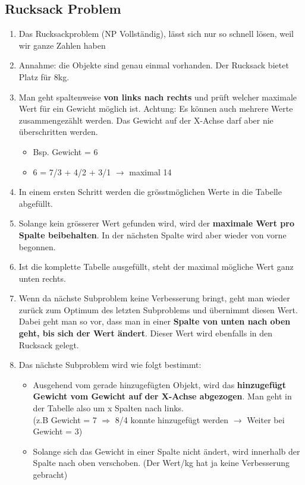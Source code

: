 \subsection{Rucksack Problem}
\begin{enumerate}
	\item Das Rucksackproblem (NP Vollständig), lässt sich nur so schnell lösen, weil wir ganze Zahlen haben
	\item Annahme: die Objekte sind genau einmal vorhanden. Der Rucksack bietet Platz für 8kg.
	\item Man geht spaltenweise \textbf{von links nach rechts} und prüft welcher maximale Wert für ein Gewicht möglich ist. Achtung: Es können auch mehrere Werte zusammengezählt werden. Das Gewicht auf der X-Achse darf aber nie überschritten werden.
	\begin{itemize}
		\item Bsp. Gewicht = 6
		\item 6 = 7/3 + 4/2 + 3/1 $\rightarrow$ maximal 14
	\end{itemize}
	\item In einem ersten Schritt werden die grösstmöglichen Werte in die Tabelle abgefüllt.
	\item Solange kein grösserer Wert gefunden wird, wird der \textbf{maximale Wert pro Spalte beibehalten}. In der nächsten Spalte wird aber wieder von vorne begonnen.
	\item Ist die komplette Tabelle ausgefüllt, steht der maximal mögliche Wert ganz unten rechts.
	\item Wenn da nächste Subproblem keine Verbesserung bringt, geht man wieder zurück zum Optimum des letzten Subproblems und übernimmt diesen Wert. Dabei geht man so vor, dass man in einer \textbf{Spalte von unten nach oben geht, bis sich der Wert ändert}. Dieser Wert wird ebenfalls in den Rucksack gelegt.
	\item Das nächste Subproblem wird wie folgt bestimmt:
	\begin{itemize}
		\item Ausgehend vom gerade hinzugefügten Objekt, wird das \textbf{hinzugefügt Gewicht vom Gewicht auf der X-Achse abgezogen}. Man geht in der Tabelle also um x Spalten nach links. \\
		(z.B Gewicht = 7 $\Rightarrow$ 8/4 konnte hinzugefügt werden $\rightarrow$ Weiter bei Gewicht = 3)
		\item Solange sich das Gewicht in einer Spalte nicht ändert, wird innerhalb der Spalte nach oben verschoben. (Der Wert/kg hat ja keine Verbesserung gebracht)
	\end{itemize}
\end{enumerate}

